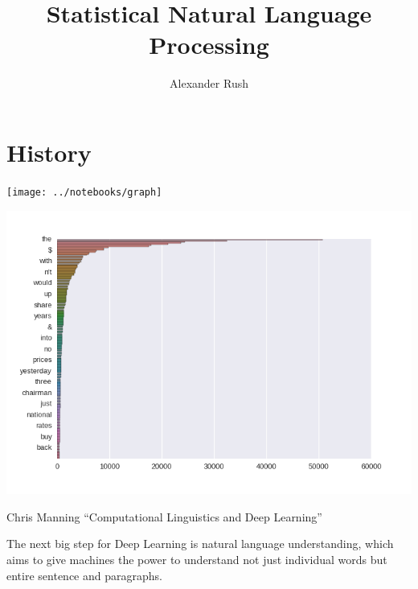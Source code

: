 \documentclass{beamer}
\title{Statistical Natural Language Processing}
\author{Alexander Rush}
\begin{document}
\begin{frame}
  \titlepage
\end{frame}


\section{History}

\begin{frame}
  
\end{frame}


\begin{frame}
  \vspace{-5cm}
  
  \hspace*{-2cm}
  \texttt{[image: ../notebooks/graph]}
\end{frame}

\begin{frame}
  
  \hspace*{-1cm} \includegraphics[width=1.2\textwidth]{../notebooks/zipf}
  
\end{frame}

\begin{frame}
  Chris Manning ``Computational Linguistics and Deep Learning''
\end{frame}

\begin{frame}
  The next big step for Deep Learning is natural language understanding, which aims to give machines the power to understand not just individual words but entire sentence and paragraphs. 
\end{frame}
\end{document}

